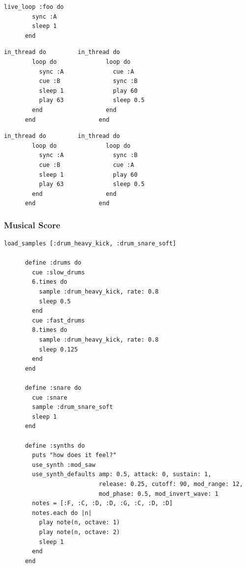 \documentclass[11pt, abstracton, twoside, titlepage=true]{scrartcl}
\begin{document}
\begin{minipage}{\textwidth}
	\begin{lstlisting}[style = sonicpi]
      live_loop :foo do
        sync :A
        sleep 1
      end
	\end{lstlisting}
\end{minipage}

\begin{minipage}{\textwidth}
	\begin{lstlisting}[style = sonicpi]
      in_thread do         in_thread do
        loop do              loop do
          sync :A              cue :A 
          cue :B               sync :B
          sleep 1              play 60
          play 63              sleep 0.5
        end                  end
      end                  end
	\end{lstlisting}
\end{minipage}

\begin{minipage}{\textwidth}
	\begin{lstlisting}[style = sonicpi]
      in_thread do         in_thread do
        loop do              loop do
          sync :A              sync :B 
          cue :B               cue :A 
          sleep 1              play 60
          play 63              sleep 0.5
        end                  end
      end                  end
	\end{lstlisting}
\end{minipage}

\subsubsection{Musical Score}
\begin{minipage}{\textwidth}
	\begin{lstlisting}[style = sonicpi]
      load_samples [:drum_heavy_kick, :drum_snare_soft]

      define :drums do
        cue :slow_drums
        6.times do
          sample :drum_heavy_kick, rate: 0.8
          sleep 0.5
        end
        cue :fast_drums
        8.times do
          sample :drum_heavy_kick, rate: 0.8
          sleep 0.125
        end
      end
      
      define :snare do
        cue :snare
        sample :drum_snare_soft
        sleep 1
      end
      
      define :synths do
        puts "how does it feel?"
        use_synth :mod_saw
        use_synth_defaults amp: 0.5, attack: 0, sustain: 1, 
                           release: 0.25, cutoff: 90, mod_range: 12, 
                           mod_phase: 0.5, mod_invert_wave: 1
        notes = [:F, :C, :D, :D, :G, :C, :D, :D]
        notes.each do |n|
          play note(n, octave: 1)
          play note(n, octave: 2)
          sleep 1
        end
      end
    \end{lstlisting}
\end{minipage}
\end{document}
